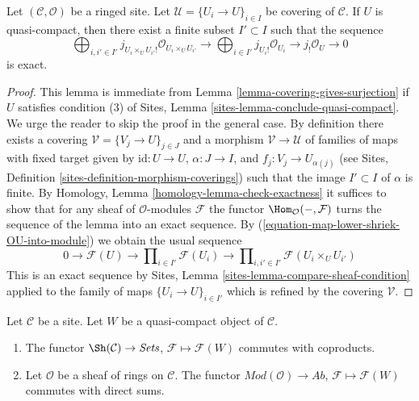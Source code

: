 \begin{lemma}
\label{lemma-silly-quasi-compact}
Let $(\mathcal{C}, \mathcal{O})$ be a ringed site. Let
$\mathcal{U} = \{U_i \to U\}_{i \in I}$ be covering of $\mathcal{C}$.
If $U$ is quasi-compact, then there exist a finite subset
$I' \subset I$ such that the sequence
$$
\bigoplus\nolimits_{i, i' \in I'}
j_{U_i \times_U U_{i'}!}\mathcal{O}_{U_i \times_U U_{i'}} \to
\bigoplus\nolimits_{i \in I'}
j_{U_i!}\mathcal{O}_{U_i} \to
j_!\mathcal{O}_U \to 0
$$
is exact.
\end{lemma}

\begin{proof}
This lemma is immediate from Lemma \ref{lemma-covering-gives-surjection}
if $U$ satisfies condition (3) of
Sites, Lemma \ref{sites-lemma-conclude-quasi-compact}.
We urge the reader to skip the proof in the general case.
By definition there exists a covering
$\mathcal{V} = \{V_j \to U\}_{j \in J}$ and a morphism
$\mathcal{V} \to \mathcal{U}$ of families of maps with fixed target
given by $\text{id} : U \to U$, $\alpha : J \to I$, and
$f_j : V_j \to U_{\alpha(j)}$
(see Sites, Definition \ref{sites-definition-morphism-coverings})
such that the image $I' \subset I$ of $\alpha$ is finite.
By Homology, Lemma \ref{homology-lemma-check-exactness}
it suffices to show that for any sheaf of $\mathcal{O}$-modules $\mathcal{F}$
the functor $\Hom_\mathcal{O}(-, \mathcal{F})$ turns the sequence
of the lemma into an exact sequence. By
(\ref{equation-map-lower-shriek-OU-into-module})
we obtain the usual sequence
$$
0 \to
\mathcal{F}(U) \to
\prod\nolimits_{i \in I'} \mathcal{F}(U_i) \to
\prod\nolimits_{i, i' \in I'} \mathcal{F}(U_i \times_U U_{i'})
$$
This is an exact sequence by
Sites, Lemma \ref{sites-lemma-compare-sheaf-condition}
applied to the family of maps $\{U_i \to U\}_{i \in I'}$
which is refined by the covering $\mathcal{V}$.
\end{proof}

\begin{lemma}
\label{lemma-sections-over-quasi-compact}
Let $\mathcal{C}$ be a site. Let $W$ be a quasi-compact
object of $\mathcal{C}$.
\begin{enumerate}
\item The functor $\Sh(\mathcal{C}) \to \textit{Sets}$,
$\mathcal{F} \mapsto \mathcal{F}(W)$ commutes with coproducts.
\item Let $\mathcal{O}$ be a sheaf of rings on $\mathcal{C}$. The functor
$\textit{Mod}(\mathcal{O}) \to \textit{Ab}$,
$\mathcal{F} \mapsto \mathcal{F}(W)$
commutes with direct sums.
\end{enumerate}
\end{lemma}


